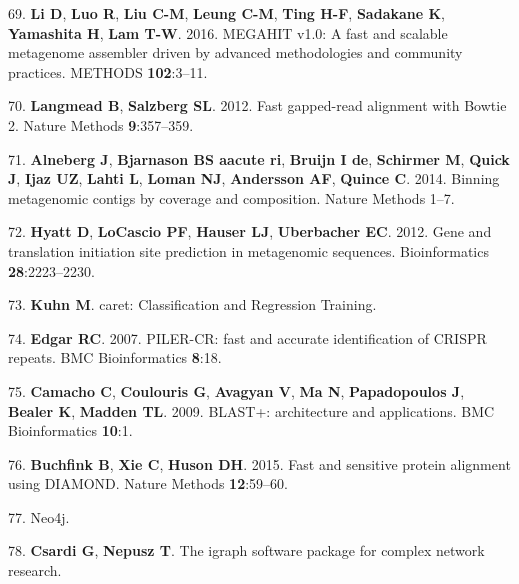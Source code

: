 \documentclass[12pt,]{article}
\begin{document}
\hypertarget{ref-Li:2016kd}{}
69. \textbf{Li D}, \textbf{Luo R}, \textbf{Liu C-M}, \textbf{Leung C-M},
\textbf{Ting H-F}, \textbf{Sadakane K}, \textbf{Yamashita H},
\textbf{Lam T-W}. 2016. MEGAHIT v1.0: A fast and scalable metagenome
assembler driven by advanced methodologies and community practices.
METHODS \textbf{102}:3--11.

\hypertarget{ref-Langmead:2012jh}{}
70. \textbf{Langmead B}, \textbf{Salzberg SL}. 2012. Fast gapped-read
alignment with Bowtie 2. Nature Methods \textbf{9}:357--359.

\hypertarget{ref-Alneberg:2014fc}{}
71. \textbf{Alneberg J}, \textbf{Bjarnason BS aacute ri}, \textbf{Bruijn
I de}, \textbf{Schirmer M}, \textbf{Quick J}, \textbf{Ijaz UZ},
\textbf{Lahti L}, \textbf{Loman NJ}, \textbf{Andersson AF},
\textbf{Quince C}. 2014. Binning metagenomic contigs by coverage and
composition. Nature Methods 1--7.

\hypertarget{ref-Hyatt:2012cy}{}
72. \textbf{Hyatt D}, \textbf{LoCascio PF}, \textbf{Hauser LJ},
\textbf{Uberbacher EC}. 2012. Gene and translation initiation site
prediction in metagenomic sequences. Bioinformatics
\textbf{28}:2223--2230.

\hypertarget{ref-caretClassificatio:ux5fU2Litux5f1}{}
73. \textbf{Kuhn M}. caret: Classification and Regression Training.

\hypertarget{ref-Edgar:2007bh}{}
74. \textbf{Edgar RC}. 2007. PILER-CR: fast and accurate identification
of CRISPR repeats. BMC Bioinformatics \textbf{8}:18.

\hypertarget{ref-Camacho:2009fc}{}
75. \textbf{Camacho C}, \textbf{Coulouris G}, \textbf{Avagyan V},
\textbf{Ma N}, \textbf{Papadopoulos J}, \textbf{Bealer K},
\textbf{Madden TL}. 2009. BLAST+: architecture and applications. BMC
Bioinformatics \textbf{10}:1.

\hypertarget{ref-Buchfink:2015ki}{}
76. \textbf{Buchfink B}, \textbf{Xie C}, \textbf{Huson DH}. 2015. Fast
and sensitive protein alignment using DIAMOND. Nature Methods
\textbf{12}:59--60.

\hypertarget{ref-Neoj:Fuwr6PBN}{}
77. Neo4j.

\hypertarget{ref-Theigraphsoftware:vh}{}
78. \textbf{Csardi G}, \textbf{Nepusz T}. The igraph software package
for complex network research.
\end{document}
